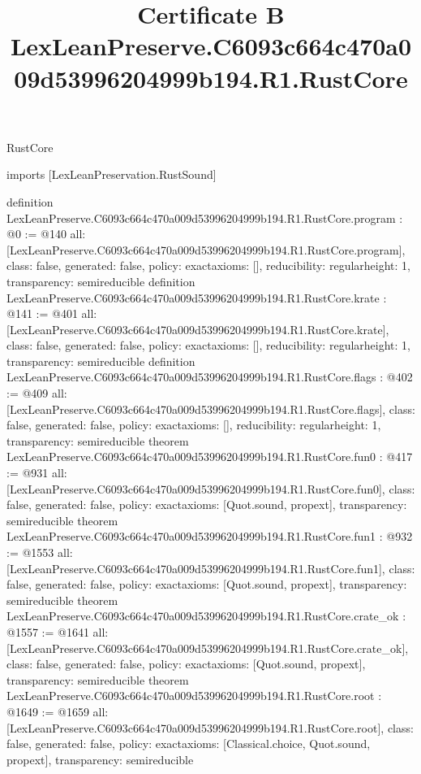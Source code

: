 \begin{lexlean}{RustCore}
\title{Certificate B LexLeanPreserve.C6093c664c470a009d53996204999b194.R1.RustCore}
\begin{coremodule}
imports [LexLeanPreservation.RustSound]

definition LexLeanPreserve.C6093c664c470a009d53996204999b194.R1.RustCore.program : @0 := @140 {
  all: [LexLeanPreserve.C6093c664c470a009d53996204999b194.R1.RustCore.program],
  class: false,
  generated: false,
  policy: exact{axioms: []},
  reducibility: regular{height: 1},
  transparency: semireducible
}
definition LexLeanPreserve.C6093c664c470a009d53996204999b194.R1.RustCore.krate : @141 := @401 {
  all: [LexLeanPreserve.C6093c664c470a009d53996204999b194.R1.RustCore.krate],
  class: false,
  generated: false,
  policy: exact{axioms: []},
  reducibility: regular{height: 1},
  transparency: semireducible
}
definition LexLeanPreserve.C6093c664c470a009d53996204999b194.R1.RustCore.flags : @402 := @409 {
  all: [LexLeanPreserve.C6093c664c470a009d53996204999b194.R1.RustCore.flags],
  class: false,
  generated: false,
  policy: exact{axioms: []},
  reducibility: regular{height: 1},
  transparency: semireducible
}
theorem LexLeanPreserve.C6093c664c470a009d53996204999b194.R1.RustCore.fun0 : @417 := @931 {
  all: [LexLeanPreserve.C6093c664c470a009d53996204999b194.R1.RustCore.fun0],
  class: false,
  generated: false,
  policy: exact{axioms: [Quot.sound, propext]},
  transparency: semireducible
}
theorem LexLeanPreserve.C6093c664c470a009d53996204999b194.R1.RustCore.fun1 : @932 := @1553 {
  all: [LexLeanPreserve.C6093c664c470a009d53996204999b194.R1.RustCore.fun1],
  class: false,
  generated: false,
  policy: exact{axioms: [Quot.sound, propext]},
  transparency: semireducible
}
theorem LexLeanPreserve.C6093c664c470a009d53996204999b194.R1.RustCore.crate_ok : @1557 := @1641 {
  all: [LexLeanPreserve.C6093c664c470a009d53996204999b194.R1.RustCore.crate_ok],
  class: false,
  generated: false,
  policy: exact{axioms: [Quot.sound, propext]},
  transparency: semireducible
}
theorem LexLeanPreserve.C6093c664c470a009d53996204999b194.R1.RustCore.root : @1649 := @1659 {
  all: [LexLeanPreserve.C6093c664c470a009d53996204999b194.R1.RustCore.root],
  class: false,
  generated: false,
  policy: exact{axioms: [Classical.choice, Quot.sound, propext]},
  transparency: semireducible
}


\end{coremodule}
\end{lexlean}
